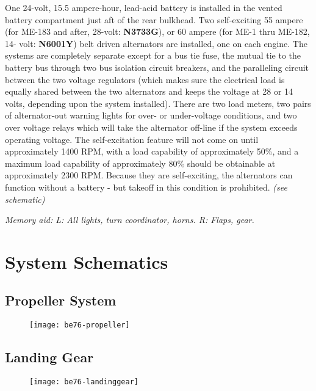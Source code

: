 One 24-volt, 15.5 ampere-hour, lead-acid battery is installed in the vented battery compartment just aft of the rear
bulkhead. Two self-exciting 55 ampere (for ME-183 and after, 28-volt: \textbf{N3733G}), or 60 ampere (for ME-1 thru ME-182, 14-
volt: \textbf{N6001Y}) belt driven alternators are installed, one on each engine. The systems are completely separate except for a bus
tie fuse, the mutual tie to the battery bus through two bus isolation circuit breakers, and the paralleling circuit
between the two voltage regulators (which makes sure the electrical load is equally shared between the two
alternators and keeps the voltage at 28 or 14 volts, depending upon the system installed). There are two load meters,
two pairs of alternator-out warning lights for over- or under-voltage conditions, and two over voltage relays which
will take the alternator off-line if the system exceeds operating voltage. The self-excitation feature will not come on
until approximately 1400 RPM, with a load capability of approximately 50\%, and a maximum load capability of
approximately 80\% should be obtainable at approximately 2300 RPM. Because they are self-exciting, the
alternators can function without a battery - but takeoff in this condition is prohibited.
\emph{(see schematic)}

\emph{Memory aid: L: All lights, turn coordinator, horns. R: Flaps, gear.}

\newpage

\section{System Schematics}

\subsection{Propeller System}

\begin{figure}[H]
\begin{center}
\texttt{[image: be76-propeller]}
\end{center}
\end{figure}

\newpage

\subsection{Landing Gear}

\begin{figure}[H]
\begin{center}
\texttt{[image: be76-landinggear]}
\end{center}
\end{figure}

